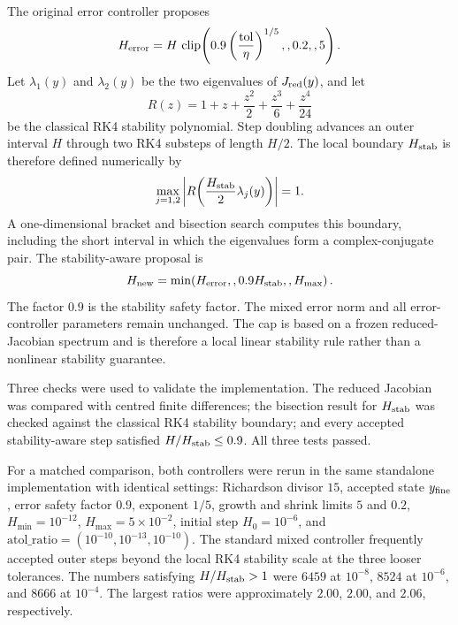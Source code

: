 The original error controller proposes
\[
H_{\rm error}
=H\,\operatorname{clip}\!\left(
0.9\left(\frac{\mathrm{tol}}{\eta}\right)^{1/5},,0.2,,5
\right).
\]
Let $\lambda_1(y)$ and $\lambda_2(y)$ be the two eigenvalues of $J_{\rm red}(y)$, and let
\[
R(z)=1+z+\frac{z^2}{2}+\frac{z^3}{6}+\frac{z^4}{24}
\]
be the classical RK4 stability polynomial. Step doubling advances an outer interval $H$ through two RK4 substeps of length $H/2$. The local boundary $H_{\rm stab}$ is therefore defined numerically by
\[
\max_{j=1,2}\left|R\!\left(\frac{H_{\rm stab}}{2}\lambda_j(y)\right)\right|=1.
\]
A one-dimensional bracket and bisection search computes this boundary, including the short interval in which the eigenvalues form a complex-conjugate pair. The stability-aware proposal is
\[
H_{\rm new}=\min\!\left(H_{\rm error},,0.9H_{\rm stab},,H_{\max}\right).
\]
The factor $0.9$ is the stability safety factor. The mixed error norm and all error-controller parameters remain unchanged. The cap is based on a frozen reduced-Jacobian spectrum and is therefore a local linear stability rule rather than a nonlinear stability guarantee.

Three checks were used to validate the implementation. The reduced Jacobian was compared with centred finite differences; the bisection result for $H_{\rm stab}$ was checked against the classical RK4 stability boundary; and every accepted stability-aware step satisfied $H/H_{\rm stab}\leq0.9$. All three tests passed.

For a matched comparison, both controllers were rerun in the same standalone implementation with identical settings: Richardson divisor $15$, accepted state $y_{\rm fine}$, error safety factor $0.9$, exponent $1/5$, growth and shrink limits $5$ and $0.2$, $H_{\min}=10^{-12}$, $H_{\max}=5\times10^{-2}$, initial step $H_0=10^{-6}$, and $\mathrm{atol\_ratio}=(10^{-10},10^{-13},10^{-10})$. The standard mixed controller frequently accepted outer steps beyond the local RK4 stability scale at the three looser tolerances. The numbers satisfying $H/H_{\rm stab}>1$ were $6459$ at $10^{-8}$, $8524$ at $10^{-6}$, and $8666$ at $10^{-4}$. The largest ratios were approximately $2.00$, $2.00$, and $2.06$, respectively.

